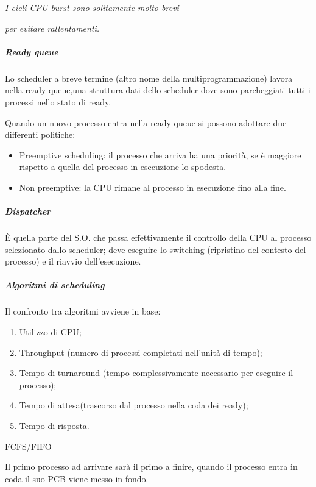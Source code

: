 \emph{I cicli CPU burst sono solitamente molto brevi}

\emph{per evitare rallentamenti.}

\subparagraph{\texorpdfstring{\emph{Ready
queue}}{Ready queue}}\label{ready-queue}

Lo scheduler a breve termine (altro nome della multiprogrammazione)
lavora nella ready queue,una struttura dati dello scheduler dove sono
parcheggiati tutti i processi nello stato di ready.

Quando un nuovo processo entra nella ready queue si possono adottare due
differenti politiche:

\begin{itemize}
\item
  Preemptive scheduling: il processo che arriva ha una priorità, se è
  maggiore rispetto a quella del processo in esecuzione lo spodesta.
\item
  Non preemptive: la CPU rimane al processo in esecuzione fino alla
  fine.
\end{itemize}

\subparagraph{\texorpdfstring{\emph{Dispatcher}}{Dispatcher}}\label{dispatcher}

È quella parte del S.O. che passa effettivamente il controllo della CPU
al processo selezionato dallo scheduler; deve eseguire lo switching
(ripristino del contesto del processo) e il riavvio dell'esecuzione.

\subparagraph{\texorpdfstring{\emph{Algoritmi di
scheduling}}{Algoritmi di scheduling}}\label{algoritmi-di-scheduling}

Il confronto tra algoritmi avviene in base:

\begin{enumerate}
\def\labelenumi{\arabic{enumi}.}
\item
  Utilizzo di CPU;
\item
  Throughput (numero di processi completati nell'unità di tempo);
\item
  Tempo di turnaround (tempo complessivamente necessario per eseguire il
  processo);
\item
  Tempo di attesa(trascorso dal processo nella coda dei ready);
\item
  Tempo di risposta.
\end{enumerate}

FCFS/FIFO

Il primo processo ad arrivare sarà il primo a finire, quando il processo
entra in coda il suo PCB viene messo in fondo.

